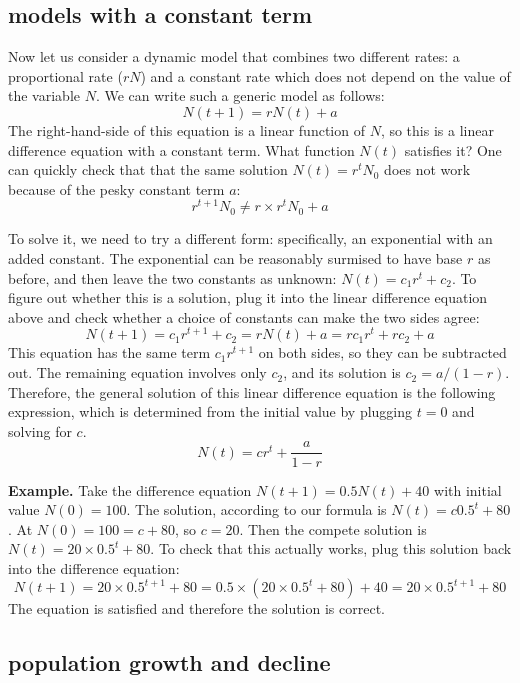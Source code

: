 \documentclass[
  letterpaper,
  DIV=11,
  numbers=noendperiod]{scrreprt}
\begin{document}
\hypertarget{models-with-a-constant-term}{%
\subsection{models with a constant
term}\label{models-with-a-constant-term}}

Now let us consider a dynamic model that combines two different rates: a
proportional rate (\(rN\)) and a constant rate which does not depend on
the value of the variable \(N\). We can write such a generic model as
follows: \[ N(t+1) =  rN(t) + a \] The right-hand-side of this equation
is a linear function of \(N\), so this is a linear difference equation
with a constant term. What function \(N(t)\) satisfies it? One can
quickly check that that the same solution \(N(t) = r^t N_0\) does not
work because of the pesky constant term \(a\):
\[ r^{t+1} N_0 \neq r \times r^t N_0 + a\]

To solve it, we need to try a different form: specifically, an
exponential with an added constant. The exponential can be reasonably
surmised to have base \(r\) as before, and then leave the two constants
as unknown: \(N(t) = c_1 r^t + c_2\). To figure out whether this is a
solution, plug it into the linear difference equation above and check
whether a choice of constants can make the two sides agree:
\[  N(t+1) =  c_1 r^{t +1} + c_2 = rN(t) + a  = rc_1 r^t + rc_2+ a\]
This equation has the same term \(c_1 r^{t +1}\) on both sides, so they
can be subtracted out. The remaining equation involves only \(c_2\), and
its solution is \(c_2 = a/(1-r)\). Therefore, the general solution of
this linear difference equation is the following expression, which is
determined from the initial value by plugging \(t=0\) and solving for
\(c\). \begin{equation}
 N(t) = c r^t  + \frac{a}{1-r}
\label{eq:ch14_sol_wconst}
\end{equation}

\textbf{Example.} Take the difference equation
\(N(t+1) = 0.5 N(t) + 40\) with initial value \(N(0)= 100\). The
solution, according to our formula is \(N(t) = c 0.5^t + 80\). At
\(N(0) = 100 = c+80\), so \(c=20\). Then the compete solution is
\(N(t) = 20 \times 0.5^t + 80\). To check that this actually works, plug
this solution back into the difference equation:
\[ N(t+1) = 20 \times 0.5^{t+1} + 80 = 0.5 \times (20 \times 0.5^t + 80) + 40 =  20 \times 0.5^{t+1} + 80\]
The equation is satisfied and therefore the solution is correct.

\hypertarget{population-growth-and-decline}{%
\subsection{population growth and
decline}\label{population-growth-and-decline}}
\end{document}
